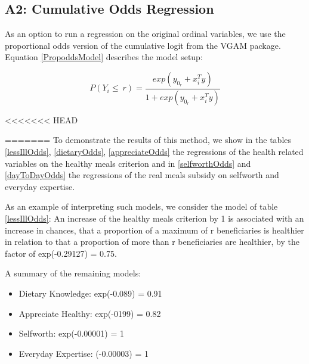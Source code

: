\documentclass[12pt, a4paper, titlepage]{article}\usepackage[]{graphicx}\usepackage[]{color}
\makeatletter
\newenvironment{kframe}{%
 \def\at@end@of@kframe{}%
 \ifinner\ifhmode%
  \def\at@end@of@kframe{\end{minipage}}%
  \begin{minipage}{\columnwidth}%
 \fi\fi%
 \def\FrameCommand##1{\hskip\@totalleftmargin \hskip-\fboxsep
 \colorbox{shadecolor}{##1}\hskip-\fboxsep
     \hskip-\linewidth \hskip-\@totalleftmargin \hskip\columnwidth}%
 \MakeFramed {\advance\hsize-\width
   \@totalleftmargin\z@ \linewidth\hsize
   \@setminipage}}%
 {\par\unskip\endMakeFramed%
 \at@end@of@kframe}
\makeatother
\begin{document}
\subsection{A2: Cumulative Odds Regression} 

As an option to run a regression on the original ordinal variables, we use the proportional odds version of the cumulative logit from the VGAM package. Equation \ref{PropoddsModel} describes the model setup: 

 
\begin{equation}
\label{PropoddsModel}
  P(Y_i \leq \ r) = \frac{exp(y_0_r + x_i^Ty)}{1+exp(y_0_r + x_i^Ty)}    
\end{equation}

\begin{kframe}


<<<<<<< HEAD
{\ttfamily\noindent\color{warningcolor}{\#\# Warning: namespace 'VGAM' is not available and has been replaced\\\#\# by .GlobalEnv when processing object ''}}\end{kframe}
=======
To demonstrate the results of this method, we show in the tables \ref{lessIllOdds}, \ref{dietaryOdds}, \ref{appreciateOdds} the regressions of the health related variables on the healthy meals criterion and in \ref{selfworthOdds} and \ref{dayToDayOdds} the regressions of the real meals subsidy on selfworth and everyday expertise. 

As an example of interpreting such models, we consider the model of table \ref{lessIllOdds}: An increase of the healthy meals criterion by 1 is associated with an increase in chances, that a proportion of a maximum of r beneficiaries is healthier in relation to that a proportion of more than r beneficiaries are healthier, by the factor of exp(-0.29127) = 0.75.

A summary of the remaining models:

\begin{itemize}
  \item{Dietary Knowledge: exp(-0.089) = 0.91}
  \item{Appreciate Healthy: exp(-0199) = 0.82}
  \item{Selfworth: exp(-0.00001) = 1}
  \item{Everyday Expertise: (-0.00003) = 1} 
\end{itemize}
\end{document}
